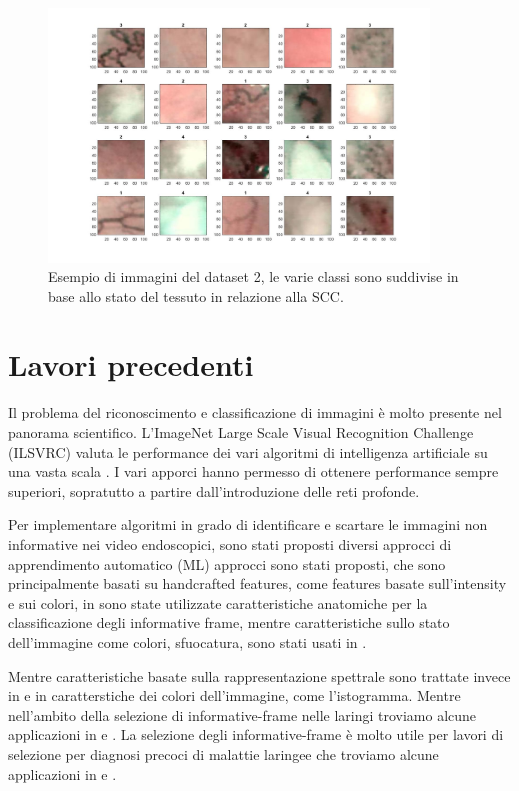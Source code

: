 \begin{figure}[ht]
    \centering
    \includegraphics[width=0.9\textwidth]{introduzione/dataset-2-ml.JPG}
    \caption[Esempio di immagini del dataset 2]{Esempio di immagini del dataset 2, le varie classi sono suddivise in base allo stato del tessuto in relazione alla SCC.}
    \label{fig:dataset2ml}
\end{figure}

\section{Lavori precedenti}\label{lavori-precedenti}

Il problema del riconoscimento e classificazione di immagini è molto presente nel panorama scientifico. L'ImageNet Large Scale Visual Recognition Challenge (ILSVRC) valuta le performance dei vari algoritmi di intelligenza artificiale su una vasta scala \cite{imagenet}. I vari apporci hanno permesso di ottenere performance sempre superiori, sopratutto a partire dall'introduzione delle reti profonde.

Per implementare algoritmi in grado di identificare e scartare le immagini non informative nei video endoscopici, sono stati proposti diversi approcci di apprendimento automatico (ML) approcci sono stati proposti, che sono principalmente basati su handcrafted features, come features basate sull'intensity e sui colori, in \cite{zhang_colon} sono state utilizzate caratteristiche anatomiche per la classificazione degli informative frame, mentre caratteristiche sullo stato dell'immagine come colori, sfuocatura, sono stati usati in \cite{armin_colonscopy}. 

Mentre caratteristiche basate sulla rappresentazione spettrale sono trattate invece in \cite{atasoy_endoscopic} \cite{haji_wce} e in \cite{bashar_endoscopy} caratterstiche dei colori dell'immagine, come l'istogramma. Mentre nell'ambito della selezione di informative-frame nelle laringi  troviamo alcune applicazioni in \cite{moccia_workflow} \cite{moccia_larynge_2} e \cite{patrini_tl}. La selezione degli informative-frame è molto utile per lavori di selezione per diagnosi precoci di malattie laringee che troviamo alcune applicazioni in \cite{moccia_larynge} \cite{turkmen_larynge} e \cite{narbalata_larynge}.

